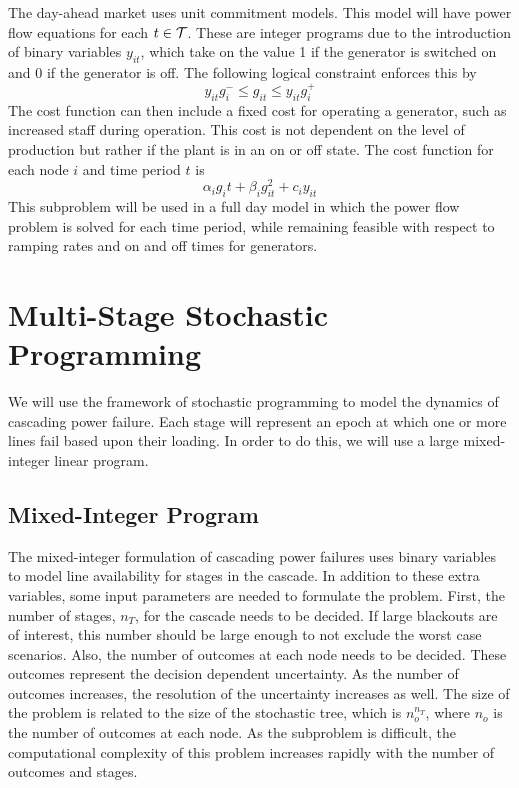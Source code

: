 The day-ahead market uses unit commitment models.  This model will have power flow equations for each $t \in \mathcal{T}$.  These are integer programs due to the introduction of binary variables $y_{it}$, which take on the value 1 if the generator is switched on and 0 if the generator is off.  The following logical constraint enforces this by
\begin{equation}
y_{it} g_i^- \le g_{it} \le y_{it} g_i^+
\end{equation}
The cost function can then include a fixed cost for operating a generator, such as increased staff during operation.  This cost is not dependent on the level of production but rather if the plant is in an on or off state.  The cost function for each node $i$ and time period $t$ is
\begin{equation}
\alpha_i g_it + \beta_i g_{it}^2 + c_i y_{it}
\end{equation}
This subproblem will be used in a full day model in which the power flow problem is solved for each time period, while remaining feasible with respect to ramping rates and on and off times for generators.





\section{Multi-Stage Stochastic Programming}

We will use the framework of stochastic programming to model the dynamics of cascading power failure.  Each stage will represent an epoch at which one or more lines fail based upon their loading.  In order to do this, we will use a large mixed-integer linear program.

\subsection*{Mixed-Integer Program}
The mixed-integer formulation of cascading power failures uses binary variables to model line availability for stages in the cascade.  In addition to these extra variables, some input parameters are needed to formulate the problem.  First, the number of stages, $n_T$, for the cascade needs to be decided.  If large blackouts are of interest, this number should be large enough to not exclude the worst case scenarios.  Also, the number of outcomes at each node needs to be decided.  These outcomes represent the decision dependent uncertainty.  As the number of outcomes increases, the resolution of the uncertainty increases as well.  The size of the problem is related to the size of the stochastic tree, which is $n_o^{ n_T }$, where $n_o$ is the number of outcomes at each node.  As the subproblem is difficult, the computational complexity of this problem increases rapidly with the number of outcomes and stages.

